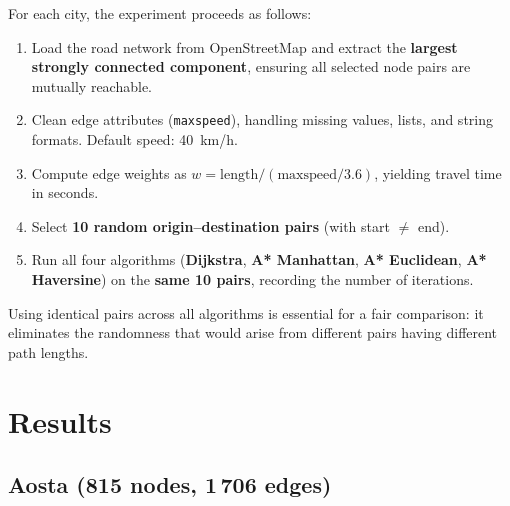 \documentclass[12pt,a4paper]{article}
\begin{document}
For each city, the experiment proceeds as follows:
\begin{enumerate}
  \item Load the road network from OpenStreetMap and extract the \textbf{largest strongly connected component}, ensuring all selected node pairs are mutually reachable.
  \item Clean edge attributes (\texttt{maxspeed}), handling missing values, lists, and string formats.  Default speed: 40~km/h.
  \item Compute edge weights as $w = \text{length} / (\text{maxspeed} / 3.6)$, yielding travel time in seconds.
  \item Select \textbf{10 random origin--destination pairs} (with start $\neq$ end).
  \item Run all four algorithms (\textbf{Dijkstra}, \textbf{A* Manhattan}, \textbf{A* Euclidean}, \textbf{A* Haversine}) on the \textbf{same 10 pairs}, recording the number of iterations.
\end{enumerate}

Using identical pairs across all algorithms is essential for a fair comparison: it eliminates the randomness that would arise from different pairs having different path lengths.


\section{Results}

\subsection{Aosta (815 nodes, 1\,706 edges)}
\end{document}

